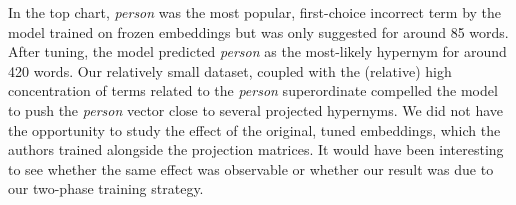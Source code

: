 In the top chart, \textit{person} was the most popular, first-choice incorrect term by the model trained on frozen embeddings but was only suggested for around 85 words.  After tuning, the model predicted \textit{person} as the most-likely hypernym for around 420 words.  Our relatively small dataset, coupled with the (relative) high concentration of terms related to the \textit{person} superordinate compelled the model to push the \textit{person} vector close to several projected hypernyms.  We did not have the opportunity to study the effect of the original, tuned embeddings, which the authors trained alongside the projection matrices.  It would have been interesting to see whether the same effect was observable or whether our result was due to our two-phase training strategy.